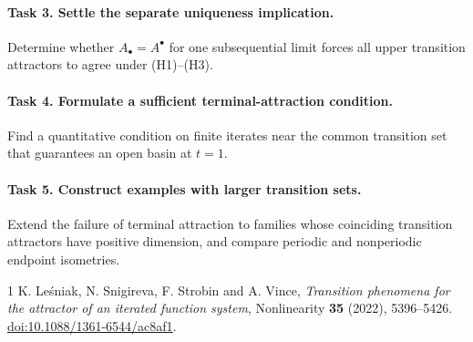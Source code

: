 \documentclass[11pt]{article}
\newcommand{\Al}{A_{\bullet}}
\newcommand{\Au}{A^{\bullet}}
\begin{document}
\paragraph{Task 3. Settle the separate uniqueness implication.}
Determine whether $\Al=\Au$ for one subsequential limit forces all
upper transition attractors to agree under (H1)--(H3).

\paragraph{Task 4. Formulate a sufficient terminal-attraction condition.}
Find a quantitative condition on finite iterates near the common
transition set that guarantees an open basin at $t=1$.

\paragraph{Task 5. Construct examples with larger transition sets.}
Extend the failure of terminal attraction to families whose coinciding
transition attractors have positive dimension, and compare periodic
and nonperiodic endpoint isometries.

\begin{thebibliography}{1}
 K. Le\'sniak, N. Snigireva, F. Strobin and A. Vince,
\emph{Transition phenomena for the attractor of an iterated function
system}, Nonlinearity \textbf{35} (2022), 5396--5426.
\href{https://doi.org/10.1088/1361-6544/ac8af1}{doi:10.1088/1361-6544/ac8af1}.
\end{thebibliography}
\end{document}
